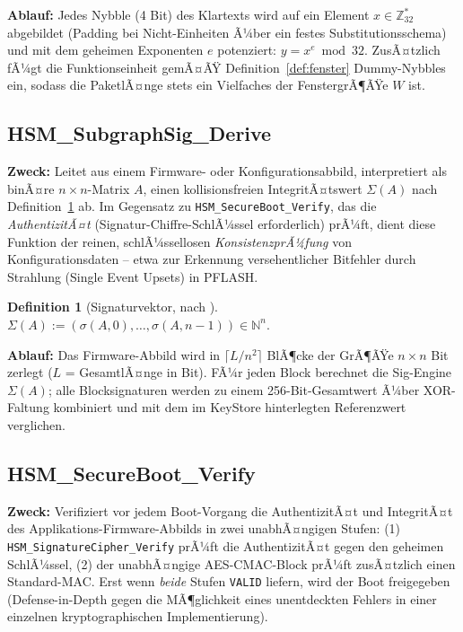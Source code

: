 ﻿\documentclass[a4paper,12pt]{article}
\theoremstyle{definition}
\newtheorem{definition}{Definition}
\begin{document}
\textbf{Ablauf:} Jedes Nybble (4 Bit) des Klartexts wird auf ein Element $x \in \mathbb{Z}_{32}^*$ abgebildet (Padding bei Nicht-Einheiten Ã¼ber ein festes Substitutionsschema) und mit dem geheimen Exponenten $e$ potenziert: $y = x^e \bmod 32$. ZusÃ¤tzlich fÃ¼gt die Funktionseinheit gemÃ¤ÃŸ Definition~\ref{def:fenster} Dummy-Nybbles ein, sodass die PaketlÃ¤nge stets ein Vielfaches der FenstergrÃ¶ÃŸe $W$ ist.

\subsection{HSM\_SubgraphSig\_Derive}
\label{sec:funk-subgraphsig}

\textbf{Zweck:} Leitet aus einem Firmware- oder Konfigurationsabbild, interpretiert als binÃ¤re $n \times n$-Matrix $A$, einen kollisionsfreien IntegritÃ¤tswert $\Sigma(A)$ nach Definition~\ref{def:sigvec} ab. Im Gegensatz zu \texttt{HSM\_SecureBoot\_Verify}, das die \emph{AuthentizitÃ¤t} (Signatur-Chiffre-SchlÃ¼ssel erforderlich) prÃ¼ft, dient diese Funktion der reinen, schlÃ¼ssellosen \emph{KonsistenzprÃ¼fung} von Konfigurationsdaten -- etwa zur Erkennung versehentlicher Bitfehler durch Strahlung (Single Event Upsets) in PFLASH.

\begin{definition}[Signaturvektor, nach \cite{Epp26a,Epp26b}]
	\label{def:sigvec}
	$\Sigma(A) := (\sigma(A,0),\ldots,\sigma(A,n-1)) \in \mathbb{N}^n$.
\end{definition}

\textbf{Ablauf:} Das Firmware-Abbild wird in $\lceil L/n^2 \rceil$ BlÃ¶cke der GrÃ¶ÃŸe $n \times n$ Bit zerlegt ($L$ = GesamtlÃ¤nge in Bit). FÃ¼r jeden Block berechnet die Sig-Engine $\Sigma(A)$; alle Blocksignaturen werden zu einem 256-Bit-Gesamtwert Ã¼ber XOR-Faltung kombiniert und mit dem im KeyStore hinterlegten Referenzwert verglichen.

\subsection{HSM\_SecureBoot\_Verify}

\textbf{Zweck:} Verifiziert vor jedem Boot-Vorgang die AuthentizitÃ¤t und IntegritÃ¤t des Applikations-Firmware-Abbilds in zwei unabhÃ¤ngigen Stufen: (1) \texttt{HSM\_SignatureCipher\_Verify} prÃ¼ft die AuthentizitÃ¤t gegen den geheimen SchlÃ¼ssel, (2) der unabhÃ¤ngige AES-CMAC-Block prÃ¼ft zusÃ¤tzlich einen Standard-MAC. Erst wenn \emph{beide} Stufen \texttt{VALID} liefern, wird der Boot freigegeben (Defense-in-Depth gegen die MÃ¶glichkeit eines unentdeckten Fehlers in einer einzelnen kryptographischen Implementierung).
\end{document}
